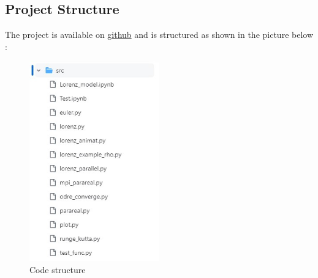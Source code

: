 \documentclass[a4paper,12pt,french]{article}
\begin{document}
\subsection{Project Structure}
The project is available on  \href{https://github.com/master-csmi/2024-m1-parareal}{github} and is structured as shown in the picture below :
\begin{figure}[ht!]
    \centering
    \includegraphics[width=0.5\textwidth]{img/code_struct.jpg}
    \caption{Code structure}
    \label{fig:7}
\end{figure}
\newline
\end{document}
